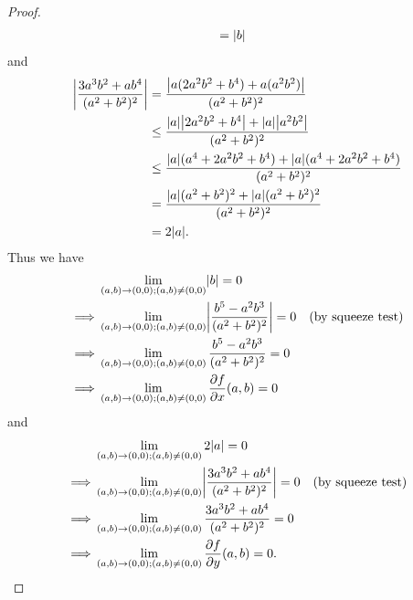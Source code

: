 \begin{proof}
\begin{align*}
                                                   & = \abs*{b}
    \end{align*}
    and
    \begin{align*}
        \abs*{\frac{3 a^3 b^2 + a b^4}{(a^2 + b^2)^2}} & = \frac{\abs*{a (2 a^2 b^2 + b^4) + a (a^2 b^2)}}{(a^2 + b^2)^2}                               \\
                                                       & \leq \frac{\abs*{a} \abs*{2 a^2 b^2 + b^4} + \abs*{a} \abs*{a^2 b^2}}{(a^2 + b^2)^2}           \\
                                                       & \leq \frac{\abs*{a} (a^4 + 2 a^2 b^2 + b^4) + \abs*{a} (a^4 + 2 a^2 b^2 + b^4)}{(a^2 + b^2)^2} \\
                                                       & = \frac{\abs*{a} (a^2 + b^2)^2 + \abs*{a} (a^2 + b^2)^2}{(a^2 + b^2)^2}                        \\
                                                       & = 2 \abs*{a}.
    \end{align*}
    Thus we have
    \begin{align*}
                 & \lim_{(a, b) \to (0, 0) ; (a, b) \neq (0, 0)} \abs*{b} = 0                                                              \\
        \implies & \lim_{(a, b) \to (0, 0) ; (a, b) \neq (0, 0)} \abs*{\frac{b^5 - a^2 b^3}{(a^2 + b^2)^2}} = 0 & \text{(by squeeze test)} \\
        \implies & \lim_{(a, b) \to (0, 0) ; (a, b) \neq (0, 0)} \frac{b^5 - a^2 b^3}{(a^2 + b^2)^2} = 0                                   \\
        \implies & \lim_{(a, b) \to (0, 0) ; (a, b) \neq (0, 0)} \frac{\partial f}{\partial x}(a, b) = 0
    \end{align*}
    and
    \begin{align*}
                 & \lim_{(a, b) \to (0, 0) ; (a, b) \neq (0, 0)} 2 \abs*{a} = 0                                                                \\
        \implies & \lim_{(a, b) \to (0, 0) ; (a, b) \neq (0, 0)} \abs*{\frac{3 a^3 b^2 + a b^4}{(a^2 + b^2)^2}} = 0 & \text{(by squeeze test)} \\
        \implies & \lim_{(a, b) \to (0, 0) ; (a, b) \neq (0, 0)} \frac{3 a^3 b^2 + a b^4}{(a^2 + b^2)^2} = 0                                   \\
        \implies & \lim_{(a, b) \to (0, 0) ; (a, b) \neq (0, 0)} \frac{\partial f}{\partial y}(a, b) = 0.

\end{align*}
\end{proof}
